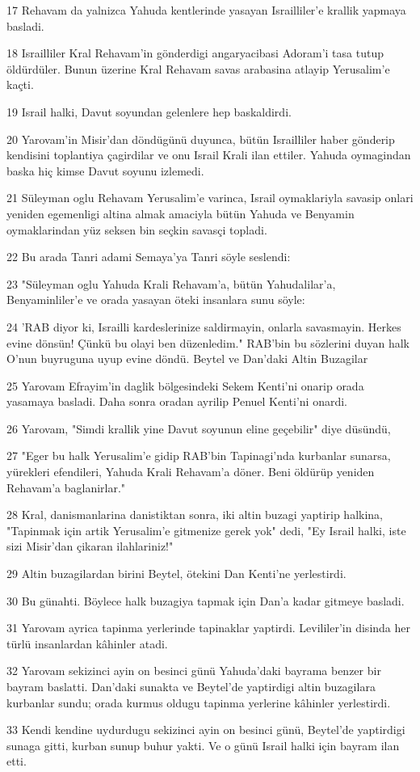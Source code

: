 \par 17 Rehavam da yalnizca Yahuda kentlerinde yasayan Israilliler'e krallik yapmaya basladi.
\par 18 Israilliler Kral Rehavam'in gönderdigi angaryacibasi Adoram'i tasa tutup öldürdüler. Bunun üzerine Kral Rehavam savas arabasina atlayip Yerusalim'e kaçti.
\par 19 Israil halki, Davut soyundan gelenlere hep baskaldirdi.
\par 20 Yarovam'in Misir'dan döndügünü duyunca, bütün Israilliler haber gönderip kendisini toplantiya çagirdilar ve onu Israil Krali ilan ettiler. Yahuda oymagindan baska hiç kimse Davut soyunu izlemedi.
\par 21 Süleyman oglu Rehavam Yerusalim'e varinca, Israil oymaklariyla savasip onlari yeniden egemenligi altina almak amaciyla bütün Yahuda ve Benyamin oymaklarindan yüz seksen bin seçkin savasçi topladi.
\par 22 Bu arada Tanri adami Semaya'ya Tanri söyle seslendi:
\par 23 "Süleyman oglu Yahuda Krali Rehavam'a, bütün Yahudalilar'a, Benyaminliler'e ve orada yasayan öteki insanlara sunu söyle:
\par 24 'RAB diyor ki, Israilli kardeslerinize saldirmayin, onlarla savasmayin. Herkes evine dönsün! Çünkü bu olayi ben düzenledim." RAB'bin bu sözlerini duyan halk O'nun buyruguna uyup evine döndü. Beytel ve Dan'daki Altin Buzagilar
\par 25 Yarovam Efrayim'in daglik bölgesindeki Sekem Kenti'ni onarip orada yasamaya basladi. Daha sonra oradan ayrilip Penuel Kenti'ni onardi.
\par 26 Yarovam, "Simdi krallik yine Davut soyunun eline geçebilir" diye düsündü,
\par 27 "Eger bu halk Yerusalim'e gidip RAB'bin Tapinagi'nda kurbanlar sunarsa, yürekleri efendileri, Yahuda Krali Rehavam'a döner. Beni öldürüp yeniden Rehavam'a baglanirlar."
\par 28 Kral, danismanlarina danistiktan sonra, iki altin buzagi yaptirip halkina, "Tapinmak için artik Yerusalim'e gitmenize gerek yok" dedi, "Ey Israil halki, iste sizi Misir'dan çikaran ilahlariniz!"
\par 29 Altin buzagilardan birini Beytel, ötekini Dan Kenti'ne yerlestirdi.
\par 30 Bu günahti. Böylece halk buzagiya tapmak için Dan'a kadar gitmeye basladi.
\par 31 Yarovam ayrica tapinma yerlerinde tapinaklar yaptirdi. Levililer'in disinda her türlü insanlardan kâhinler atadi.
\par 32 Yarovam sekizinci ayin on besinci günü Yahuda'daki bayrama benzer bir bayram baslatti. Dan'daki sunakta ve Beytel'de yaptirdigi altin buzagilara kurbanlar sundu; orada kurmus oldugu tapinma yerlerine kâhinler yerlestirdi.
\par 33 Kendi kendine uydurdugu sekizinci ayin on besinci günü, Beytel'de yaptirdigi sunaga gitti, kurban sunup buhur yakti. Ve o günü Israil halki için bayram ilan etti.

